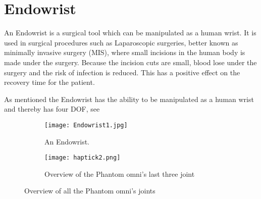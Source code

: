 \section{Endowrist}\label{sec:Endowrist}

An Endowrist is a surgical tool which can be manipulated as a human wrist. It is used in surgical procedures such as Laparoscopic surgeries, better known as minimally invasive surgery (MIS), where small incisions in the human body is made under the surgery. Because the incision cuts are small, blood lose under the surgery and the risk of infection is reduced. This has a positive effect on the recovery time for the patient.

As mentioned the Endowrist has the ability to be manipulated as a human wrist and thereby has four \gls{DOF}, see

\begin{figure}[H]
	\centering
	\begin{subfigure}{.45\textwidth}
		\centering
		\texttt{[image: Endowrist1.jpg]}
		\caption{An Endowrist.}
		\label{fig:phantom1}
	\end{subfigure}
	\begin{subfigure}{.45\textwidth}
		\centering
		\texttt{[image: haptick2.png]}
		\caption{Overview of the Phantom omni's last three joint}
		\label{fig:phantom2}
	\end{subfigure}
\caption{Overview of all the Phantom omni's joints\citep{phantom_omni}}
\label{fig:phantom_omni}
\end{figure}
